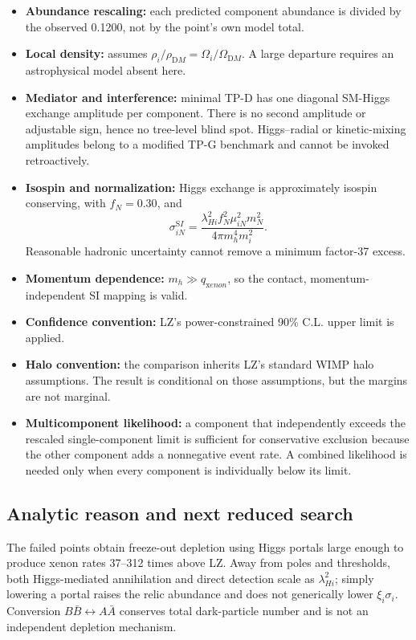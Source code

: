\documentclass[
]{article}
\providecommand{\tightlist}{%
  \setlength{\itemsep}{0pt}\setlength{\parskip}{0pt}}
\begin{document}
\begin{itemize}
\tightlist
\item
  \textbf{Abundance rescaling:} each predicted component abundance is
  divided by the observed 0.1200, not by the point's own model total.
\item
  \textbf{Local density:} assumes
  \(\rho_i/\rho_{\mathrm DM}=\Omega_i/\Omega_{\mathrm DM}\). A large
  departure requires an astrophysical model absent here.
\item
  \textbf{Mediator and interference:} minimal TP-D has one diagonal
  SM-Higgs exchange amplitude per component. There is no second
  amplitude or adjustable sign, hence no tree-level blind spot.
  Higgs--radial or kinetic-mixing amplitudes belong to a modified TP-G
  benchmark and cannot be invoked retroactively.
\item
  \textbf{Isospin and normalization:} Higgs exchange is approximately
  isospin conserving, with \(f_N=0.30\), and \[
  \sigma_{iN}^{\mathrm SI}=\frac{\lambda_{Hi}^{2}f_N^2\mu_{iN}^2m_N^2}{4\pi m_h^4m_i^2}.
  \] Reasonable hadronic uncertainty cannot remove a minimum factor-37
  excess.
\item
  \textbf{Momentum dependence:} \(m_h\gg q_{\mathrm xenon}\), so the
  contact, momentum-independent SI mapping is valid.
\item
  \textbf{Confidence convention:} LZ's power-constrained 90\% C.L. upper
  limit is applied.
\item
  \textbf{Halo convention:} the comparison inherits LZ's standard WIMP
  halo assumptions. The result is conditional on those assumptions, but
  the margins are not marginal.
\item
  \textbf{Multicomponent likelihood:} a component that independently
  exceeds the rescaled single-component limit is sufficient for
  conservative exclusion because the other component adds a nonnegative
  event rate. A combined likelihood is needed only when every component
  is individually below its limit.
\end{itemize}

\hypertarget{analytic-reason-and-next-reduced-search}{%
\subsection{Analytic reason and next reduced
search}\label{analytic-reason-and-next-reduced-search}}

The failed points obtain freeze-out depletion using Higgs portals large
enough to produce xenon rates 37--312 times above LZ. Away from poles
and thresholds, both Higgs-mediated annihilation and direct detection
scale as \(\lambda_{Hi}^2\); simply lowering a portal raises the relic
abundance and does not generically lower \(\xi_i\sigma_i\). Conversion
\(B\bar B\leftrightarrow A\bar A\) conserves total dark-particle number
and is not an independent depletion mechanism.
\end{document}
